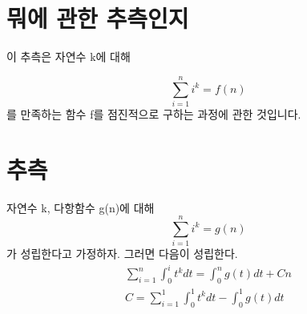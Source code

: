 \documentclass[]{article}
\date{}
\begin{document}
\hypertarget{uxbb50uxc5d0-uxad00uxd55c-uxcd94uxce21uxc778uxc9c0}{%
\section{뭐에 관한
추측인지}\label{uxbb50uxc5d0-uxad00uxd55c-uxcd94uxce21uxc778uxc9c0}}

이 추측은 자연수 k에 대해

\[ 
\sum ^{n}_{i=1}i^{k}=f\left( n\right) 
\] 를 만족하는 함수 f를 점진적으로 구하는 과정에 관한 것입니다.

\hypertarget{uxcd94uxce21}{%
\section{추측}\label{uxcd94uxce21}}

자연수 k, 다항함수 g(n)에 대해 \[
 \sum ^{n}_{i=1}i^{k}=g\left( n\right) 
 \] 가 성립한다고 가정하자. 그러면 다음이 성립한다. \[
 \begin{aligned}\sum ^{n}_{i=1}\int _{0}^{i}t^{k}dt=\int ^{n}_{0}g\left( t\right) dt+Cn\\ C=\sum ^{1}_{i=1}\int ^{1}_{0}t^{k}dt-\int _{0}^{1}g\left( t\right) dt\end{aligned} 
 \]
\end{document}
